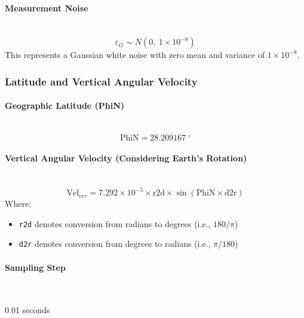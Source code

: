 \documentclass[openany,12pt,UTF8]{article}
\begin{document}
\paragraph{Measurement Noise}\
\begin{equation}
    \varepsilon_{G} \sim N(0,\ 1 \times 10^{-8})
\end{equation}
This represents a Gaussian white noise with zero mean and variance of $1 \times 10^{-8}$.

\subsubsection{Latitude and Vertical Angular Velocity}
\paragraph{Geographic Latitude (PhiN)}\
\begin{equation}
    \text{PhiN} = 28.209167\ ^\circ
\end{equation}

\paragraph{Vertical Angular Velocity (Considering Earth's Rotation)}\
\begin{equation}
    \text{Vel}_{ver} = 7.292 \times 10^{-5} \times \text{r2d} \times \sin(\text{PhiN} \times \text{d2r})
\end{equation}
Where:
\begin{itemize}
    \item \texttt{r2d} denotes conversion from radians to degrees (i.e., $180/\pi$)
    \item \texttt{d2r} denotes conversion from degrees to radians (i.e., $\pi/180$)
\end{itemize}

\paragraph{Sampling Step}\

0.01 seconds
\end{document}
